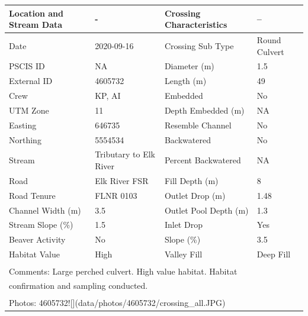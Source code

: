 \documentclass[
]{book}
\begin{document}
\begin{tabular}{l|l|l|l}
\hline
Location and Stream Data & - & Crossing Characteristics & --\\
\hline
Date & 2020-09-16 & Crossing Sub Type & Round Culvert\\
\hline
PSCIS ID & NA & Diameter (m) & 1.5\\
\hline
External ID & 4605732 & Length (m) & 49\\
\hline
Crew & KP, AI & Embedded & No\\
\hline
UTM Zone & 11 & Depth Embedded (m) & NA\\
\hline
Easting & 646735 & Resemble Channel & No\\
\hline
Northing & 5554534 & Backwatered & No\\
\hline
Stream & Tributary to Elk River & Percent Backwatered & NA\\
\hline
Road & Elk River FSR & Fill Depth (m) & 8\\
\hline
Road Tenure & FLNR 0103 & Outlet Drop (m) & 1.48\\
\hline
Channel Width (m) & 3.5 & Outlet Pool Depth (m) & 1.3\\
\hline
Stream Slope (\%) & 1.5 & Inlet Drop & Yes\\
\hline
Beaver Activity & No & Slope (\%) & 3.5\\
\hline
Habitat Value & High & Valley Fill & Deep Fill\\
\hline
\multicolumn{4}{l}{\textsuperscript{} Comments: Large perched culvert. High value habitat. Habitat}\\
\multicolumn{4}{l}{confirmation and sampling conducted.}\\
\multicolumn{4}{l}{\textsuperscript{} Photos: 4605732![](data/photos/4605732/crossing\_all.JPG)}\\
\end{tabular}
\end{document}
